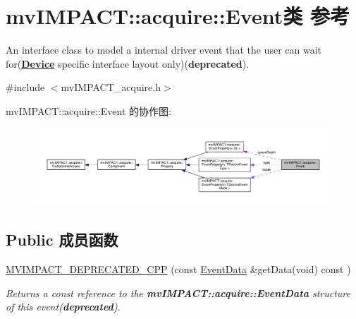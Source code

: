 \hypertarget{classmv_i_m_p_a_c_t_1_1acquire_1_1_event}{\section{mv\+I\+M\+P\+A\+C\+T\+:\+:acquire\+:\+:Event类 参考}
\label{classmv_i_m_p_a_c_t_1_1acquire_1_1_event}
}


An interface class to model a internal driver event that the user can wait for({\bfseries \hyperlink{classmv_i_m_p_a_c_t_1_1acquire_1_1_device}{Device}} specific interface layout only)({\bfseries deprecated}).  




{\ttfamily \#include $<$mv\+I\+M\+P\+A\+C\+T\+\_\+acquire.\+h$>$}



mv\+I\+M\+P\+A\+C\+T\+:\+:acquire\+:\+:Event 的协作图\+:
\nopagebreak
\begin{figure}[H]
\begin{center}
\leavevmode
\includegraphics[width=350pt]{classmv_i_m_p_a_c_t_1_1acquire_1_1_event__coll__graph}
\end{center}
\end{figure}
\subsection*{Public 成员函数}
\begin{DoxyCompactItemize}
\item 
\hyperlink{classmv_i_m_p_a_c_t_1_1acquire_1_1_event_ad0fc0c13e687365fddcf972d9b2f9daa}{M\+V\+I\+M\+P\+A\+C\+T\+\_\+\+D\+E\+P\+R\+E\+C\+A\+T\+E\+D\+\_\+\+C\+P\+P} (const \hyperlink{struct_event_data}{Event\+Data} \&get\+Data(void) const )
\begin{DoxyCompactList}\small\item\em Returns a const reference to the {\bfseries mv\+I\+M\+P\+A\+C\+T\+::acquire\+::\+Event\+Data} structure of this event({\bfseries deprecated}). \end{DoxyCompactList}\end{DoxyCompactItemize}
